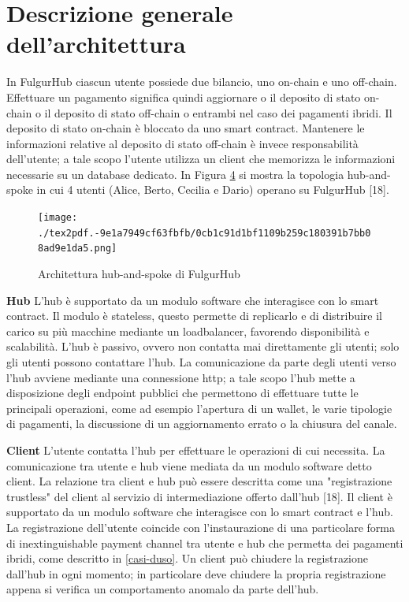 \documentclass[12pt,italian,]{book}
\begin{document}
\hypertarget{descrizione-generale-dellarchitettura}{%
\section{Descrizione generale dell'architettura}\label{descrizione-generale-dellarchitettura}}

In FulgurHub ciascun utente possiede due bilancio, uno on-chain e uno off-chain. Effettuare un pagamento significa quindi aggiornare o il deposito di stato on-chain o il deposito di stato off-chain o entrambi nel caso dei pagamenti ibridi. Il deposito di stato on-chain è bloccato da uno smart contract. Mantenere le informazioni relative al deposito di stato off-chain è invece responsabilità dell'utente; a tale scopo l'utente utilizza un client che memorizza le informazioni necessarie su un database dedicato. In Figura \protect\hyperlink{architecture-hub-and-spoke}{4} si mostra la topologia hub-and-spoke in cui 4 utenti (Alice, Berto, Cecilia e Dario) operano su FulgurHub {[}18{]}.

\begin{figure}
\centering
\texttt{[image: ./tex2pdf.-9e1a7949cf63fbfb/0cb1c91d1bf1109b259c180391b7bb08ad9e1da5.png]}
\caption{\protect\hypertarget{architecture-hub-and-spoke}{}{}Architettura hub-and-spoke di FulgurHub}
\end{figure}

\textbf{\textbf{Hub}} L'hub è supportato da un modulo software che interagisce con lo smart contract. Il modulo è stateless, questo permette di replicarlo e di distribuire il carico su più macchine mediante un loadbalancer, favorendo disponibilità e scalabilità. L'hub è passivo, ovvero non contatta mai direttamente gli utenti; solo gli utenti possono contattare l'hub. La comunicazione da parte degli utenti verso l'hub avviene mediante una connessione http; a tale scopo l'hub mette a disposizione degli endpoint pubblici che permettono di effettuare tutte le principali operazioni, come ad esempio l'apertura di un wallet, le varie tipologie di pagamenti, la discussione di un aggiornamento errato o la chiusura del canale.

\textbf{\textbf{Client}} L'utente contatta l'hub per effettuare le operazioni di cui necessita. La comunicazione tra utente e hub viene mediata da un modulo software detto client. La relazione tra client e hub può essere descritta come una "registrazione trustless" del client al servizio di intermediazione offerto dall'hub {[}18{]}. Il client è supportato da un modulo software che interagisce con lo smart contract e l'hub. La registrazione dell'utente coincide con l'instaurazione di una particolare forma di inextinguishable payment channel tra utente e hub che permetta dei pagamenti ibridi, come descritto in \ref{casi-duso}. Un client può chiudere la registrazione dall'hub in ogni momento; in particolare deve chiudere la propria registrazione appena si verifica un comportamento anomalo da parte dell'hub.
\end{document}
